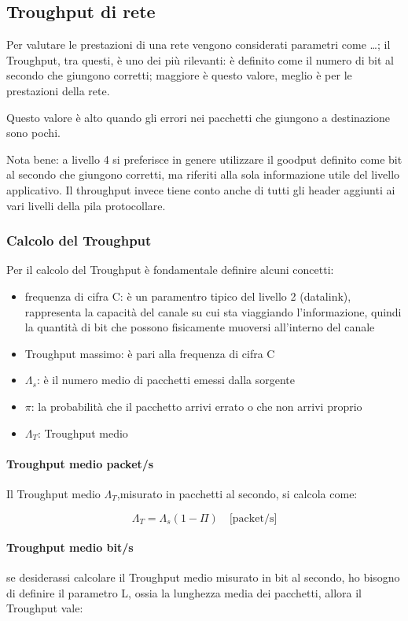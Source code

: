 \subsection{Troughput di rete}
Per valutare le prestazioni di una rete vengono considerati parametri come \dots;
il Troughput, tra questi, è uno dei più rilevanti: è definito come il numero di bit al secondo che giungono corretti; maggiore è questo valore, meglio è per le prestazioni della rete.

Questo valore è alto quando gli errori nei pacchetti che giungono a destinazione sono pochi.

Nota bene: a livello 4 si preferisce in genere utilizzare il
goodput definito come bit al secondo che giungono corretti,
ma riferiti alla sola informazione utile del livello applicativo. Il
throughput invece tiene conto anche di tutti gli header aggiunti
ai vari livelli della pila protocollare.


\subsubsection{Calcolo del Troughput}

Per il calcolo del Troughput è fondamentale definire alcuni concetti:
\begin{itemize}
    \item frequenza di cifra C: è un paramentro tipico del livello 2 (datalink), rappresenta la capacità del canale su cui sta viaggiando l'informazione, quindi la quantità di bit che possono fisicamente muoversi all'interno del canale
    \item Troughput massimo: è pari alla frequenza di cifra C
    \item $\Lambda_s$: è il numero medio di pacchetti emessi dalla sorgente
    \item $\pi$: la probabilità che il pacchetto arrivi errato o che non arrivi proprio
    \item $\Lambda_T$: Troughput medio
\end{itemize}
\paragraph{Troughput medio packet/s}
Il Troughput medio $\Lambda_T$,misurato in pacchetti al secondo, si calcola come:

\begin{equation}
    \Lambda_T = \Lambda_s (1 - \Pi) \quad \text{[packet/s]}
\end{equation}
\paragraph{Troughput medio bit/s}
se desiderassi calcolare il Troughput medio misurato in bit al secondo, ho bisogno di definire il parametro L, ossia la lunghezza media dei pacchetti, allora il Troughput vale:

